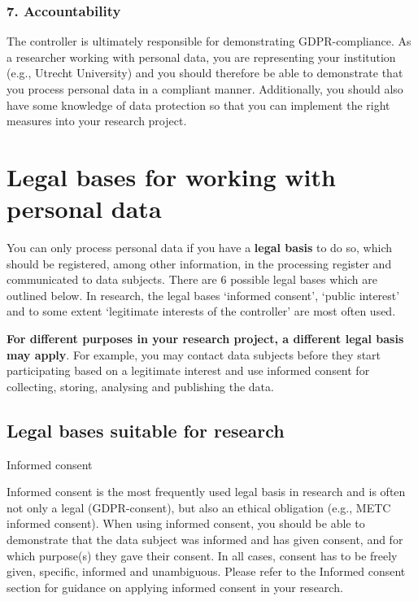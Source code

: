 \documentclass[
]{book}
\begin{document}
\hypertarget{accountability}{%
\subsubsection{7. Accountability}\label{accountability}}

The controller is ultimately responsible for demonstrating GDPR-compliance. As a
researcher working with personal data, you are representing your institution
(e.g., Utrecht University) and you should therefore be able to demonstrate that
you process personal data in a compliant manner. Additionally, you should also
have some knowledge of data protection so that you can implement the right
measures into your research project.

\hypertarget{legal-basis}{%
\section{Legal bases for working with personal data}\label{legal-basis}}

You can only process personal data if you have a \textbf{legal basis} to do so, which
should be registered, among other information, in the
processing register and
communicated to data subjects. There are 6 possible
legal bases which are outlined below. In research, the legal bases `informed
consent', `public interest' and to some extent `legitimate interests of the
controller' are most often used.

\textbf{For different purposes in your research project, a different
legal basis may apply}. For example, you may contact data subjects before they
start participating based on a legitimate interest and use informed consent for
collecting, storing, analysing and publishing the data.

\hypertarget{legal-bases-suitable-for-research}{%
\subsection{Legal bases suitable for research}\label{legal-bases-suitable-for-research}}

Informed consent

Informed consent is the most frequently used legal basis in research and
is often not only a legal (GDPR-consent), but also an ethical obligation
(e.g., METC informed consent). When using informed consent, you should
be able to demonstrate that the data subject was informed and has given
consent, and for which purpose(s) they gave their consent. In all cases,
consent has to be freely given, specific, informed and unambiguous. Please
refer to the Informed consent section
for guidance on applying informed consent in your research.
\end{document}

